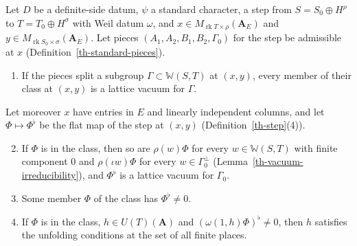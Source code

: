\begin{lemma}\label{th-standard-class}
Let $D$ be a definite-side datum, $\psi$ a standard character, a step from
$S=S_0\oplus H^\rho$ to $T=T_0\oplus H^\sigma$ with Weil datum $\omega$, and
$x\in M_{\operatorname{rk}T\times\rho}(\mathbf A_E)$ and
$y\in M_{\operatorname{rk}S_0\times\sigma}(\mathbf A_E)$. Let pieces
$(A_1,A_2,B_1,B_2,\Gamma_0)$ for the step be admissible at $x$
(Definition~\ref{th-standard-pieces}).
\begin{enumerate}
\item If the pieces split a subgroup $\Gamma\subset\mathbb W(S,T)$ at $(x,y)$,
  every member of their class at $(x,y)$ is a lattice vacuum for $\Gamma$.
\end{enumerate}
Let moreover $x$ have entries in $E$ and linearly independent columns, and let
$\Phi\mapsto\Phi^\flat$ be the flat map of the step at $(x,y)$
(Definition~\ref{th-step}(4)).
\begin{enumerate}\setcounter{enumi}{1}
\item If $\Phi$ is in the class, then so are $\rho(w)\Phi$ for every
  $w\in\mathbb W(S,T)$ with finite component $0$ and $\rho(\iota w)\Phi$ for
  every $w\in\Gamma_0^\perp$ (Lemma~\ref{th-vacuum-irreducibility}), and
  $\Phi^\flat$ is a lattice vacuum for $\Gamma_0$.
\item Some member $\Phi$ of the class has $\Phi^\flat\neq0$.
\item If $\Phi$ is in the class, $h\in U(T)(\mathbf A)$ and
  $(\omega(1,h)\Phi)^\flat\neq0$, then $h$ satisfies the unfolding conditions at
  the set of all finite places.
\end{enumerate}
\end{lemma}
